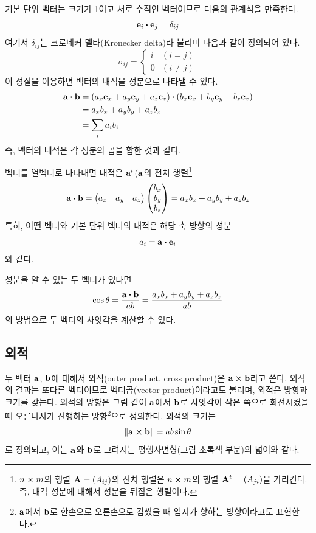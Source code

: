 기본 단위 벡터는 크기가 1이고 서로 수직인 벡터이므로 다음의 관계식을 만족한다.
\[
  \vb{e}_i \vdot \vb{e}_j  = \delta_{ij}
\]
여기서 $\delta_{ij}$는 크로네커 델타(Kronecker delta)라 불리며 다음과 같이 정의되어 있다.
\[
  \sigma_{ij} = \begin{cases}
    i & (i = j)    \\
    0 & (i \neq j)
  \end{cases}
\]
이 성질을 이용하면 벡터의 내적을 성분으로 나타낼 수 있다.
\begin{align*}
  \vb{a} \vdot \vb{b} & = (a_x \vb{e}_x + a_y \vb{e}_y + a_z \vb{e}_z) \vdot (b_x \vb{e}_x + b_y \vb{e}_y + b_z \vb{e}_z) \\
                      & = a_x b_x + a_y b_y + a_z b_z                                                                     \\
                      & = \sum_i{a_i b_i}
\end{align*}
즉, 벡터의 내적은 각 성분의 곱을 합한 것과 같다.

벡터를 열벡터로 나타내면 내적은 $\vb{a}^t$($\vb{a}$의 전치 행렬\footnote{$n \cp m$의 행렬 $\vb{A} = (A_{ij})$의 전치 행렬은 $n \cp m$의 행렬 $\vb{A}^t = (A_{ji})$을 가리킨다. 즉, 대각 성분에 대해서 성분을 뒤집은 행렬이다.}
\[
  \vb{a} \vdot \vb{b} = \begin{pmatrix}
    a_x & a_y & a_z
  \end{pmatrix} \begin{pmatrix}
    b_x \\
    b_y \\
    b_z
  \end{pmatrix} = a_x b_x + a_y b_y + a_z b_z
\]
특히, 어떤 벡터와 기본 단위 벡터의 내적은 해당 축 방향의 성분
\[
  a_i = \vb{a} \vdot \vb{e}_i
\]
와 같다.

성분을 알 수 있는 두 벡터가 있다면
\[
  \cos{\theta} = \frac{\vb{a} \vdot \vb{b}}{ab} = \frac{a_x b_x + a_y b_y + a_z b_z}{ab}
\]
의 방법으로 두 벡터의 사잇각을 계산할 수 있다.

\subsection{외적}
두 벡터 $\vb{a}$, $\vb{b}$에 대해서 외적(outer product, cross product)은 $\vb{a} \cp \vb{b}$라고 쓴다. 외적의 결과는 또다른 벡터이므로 벡터곱(vector product)이라고도 불리며, 외적은 방향과 크기를 갖는다. 외적의 방향은 그림  같이 $\vb{a}$에서 $\vb{b}$로 사잇각이 작은 쪽으로 회전시켰을 때 오른나사가 진행하는 방향\footnote{$\vb{a}$에서 $\vb{b}$로 한손으로 오른손으로 감쌌을 때 엄지가 향하는 방향이라고도 표현한다.}으로 정의한다. 외적의 크기는
\[
  \norm{\vb{a} \cp \vb{b}} = ab \sin{\theta}
\]
로 정의되고, 이는 $\vb{a}$와 $\vb{b}$로 그려지는 평행사변형(그림  초록색 부분)의 넓이와 같다.

